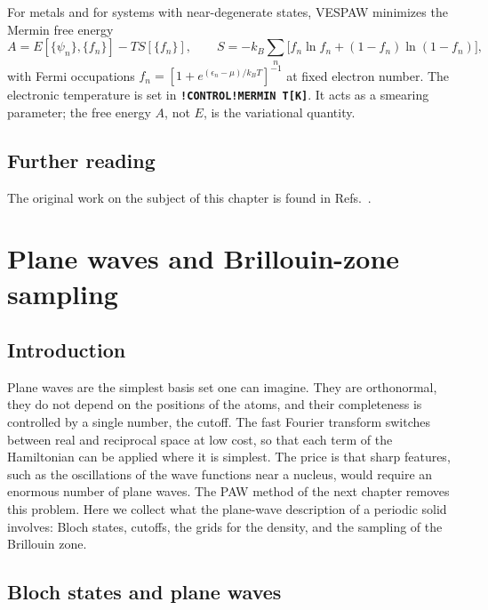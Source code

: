\documentclass[11pt,a4paper,oneside]{book}
\newcommand{\key}[1]{\textbf{\texttt{#1}}}
\begin{document}
For metals and for systems with near-degenerate states, VESPAW minimizes
the Mermin free energy~\cite{Mermin1965}
\begin{equation}
  A = E[\{\psi_n\},\{f_n\}] - T S[\{f_n\}],\qquad
  S=-k_B\sum_n\bigl[f_n\ln f_n+(1-f_n)\ln(1-f_n)\bigr],
  \label{eq:mermin}
\end{equation}
with Fermi occupations $f_n=[1+e^{(\epsilon_n-\mu)/k_BT}]^{-1}$ at fixed
electron number. The electronic temperature is set in \key{!CONTROL!MERMIN
T[K]}. It acts as a smearing parameter; the free energy $A$, not $E$, is
the variational quantity.


\section*{Further reading}
The original work on the subject of this chapter is found in
Refs.~\cite{born27_ap84_457,HohenbergKohn1964,KohnSham1965,levy79_pnas76_6062,gunnarsson76_prb13_4274,Mermin1965,perdew96_prl77_3865,sun15_prl115_036402}.

\chapter{Plane waves and Brillouin-zone sampling}\label{chap:planewaves}
\minitoc
\section{Introduction}

Plane waves are the simplest basis set one can imagine. They are
orthonormal, they do not depend on the positions of the atoms, and
their completeness is controlled by a single number, the cutoff. The
fast Fourier transform switches between real and reciprocal space at
low cost, so that each term of the Hamiltonian can be applied where it
is simplest. The price is that sharp features, such as the oscillations
of the wave functions near a nucleus, would require an enormous number
of plane waves. The PAW method of the next chapter removes this
problem. Here we collect what the plane-wave description of a periodic
solid involves: Bloch states, cutoffs, the grids for the density, and
the sampling of the Brillouin zone.


\section{Bloch states and plane waves}
\end{document}
